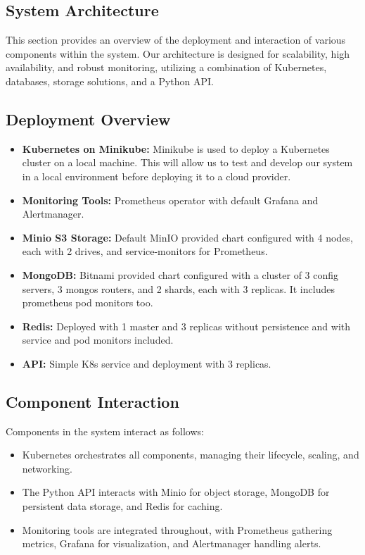 \documentclass{article}
\begin{document}
    \subsection{System Architecture}
    This section provides an overview of the deployment and interaction of various components within the system. Our architecture is designed for scalability, high availability, and robust monitoring, utilizing a combination of Kubernetes, databases, storage solutions, and a Python API.

    \subsection{Deployment Overview}

    \begin{itemize}
        \item \textbf{Kubernetes on Minikube:} Minikube is used to deploy a Kubernetes cluster on a local machine. This will allow us to test and develop our system in a local environment before deploying it to a cloud provider.
        \item \textbf{Monitoring Tools:} Prometheus operator with default Grafana and Alertmanager.
        \item \textbf{Minio S3 Storage:} Default MinIO provided chart configured with 4 nodes, each with 2 drives, and service-monitors for Prometheus.
        \item \textbf{MongoDB:} Bitnami provided chart configured with a cluster of 3 config servers, 3 mongos routers, and 2 shards, each with 3 replicas. It includes prometheus pod monitors too.
        \item \textbf{Redis:} Deployed with 1 master and 3 replicas without persistence and with service and pod monitors included.
        \item \textbf{API:} Simple K8s service and deployment with 3 replicas.
    \end{itemize}

    \subsection{Component Interaction}

    Components in the system interact as follows:

    \begin{itemize}
        \item Kubernetes orchestrates all components, managing their lifecycle, scaling, and networking.
        \item The Python API interacts with Minio for object storage, MongoDB for persistent data storage, and Redis for caching.
        \item Monitoring tools are integrated throughout, with Prometheus gathering metrics, Grafana for visualization, and Alertmanager handling alerts.
    \end{itemize}
\end{document}
